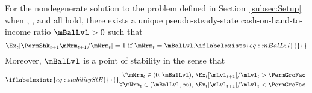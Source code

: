   \begin{theorem}
    For the nondegenerate solution to the problem defined in Section~\ref{subsec:Setup} when {\FVAC}, {\WRIC}, and {\GICRaw} all hold, there exists a unique pseudo-steady-state cash-on-hand-to-income ratio $\mBalLvl>0$ such that
    \begin{equation}
      \Ex_t [\PermShk_{t+1}{\mNrm}_{t+1}/\mNrm_t] = 1 \mbox{~if~} \mNrm_t = \mBalLvl.
      \iflabelexists{eq:mBalLvl}{}{\label{eq:mBalLvl}} %
    \end{equation}
    Moreover, $\mBalLvl$ is a point of stability in the sense that
    \begin{equation}
      \iflabelexists{eq:stabilityStE}{}{\label{eq:stabilityStE}} %
      \begin{split}
        \forall {\mNrm}_t\in(0,\mBalLvl),      \,\,& \Ex_{t}[\mLvl_{t+1}]/\mLvl_{t} > \PermGroFac \\
        \forall {\mNrm}_t\in(\mBalLvl,\infty), \,\,& \Ex_{t}[\mLvl_{t+1}]/\mLvl_{t} < \PermGroFac.
      \end{split}
    \end{equation}
  \end{theorem}

